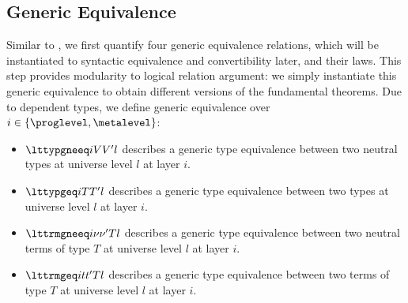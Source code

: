 \subsection{Generic Equivalence}

Similar to , we first quantify four generic equivalence relations,
which will be instantiated to syntactic equivalence and convertibility later, and
their laws. %
This step provides modularity to logical relation argument: we simply instantiate this
generic equivalence to obtain different versions of the fundamental theorems. %
Due to dependent types, we define generic equivalence over $i \in \{\proglevel, \metalevel\}$:
\begin{itemize}
\item $\lttypgneeq i V{V'} l$ describes a generic type equivalence between two neutral
  types at universe level $l$ at layer $i$.
\item $\lttypgeq i {T}{T'} l$ describes a generic type equivalence between two types at
  universe level $l$ at layer $i$.
\item $\lttrmgneeq i \nu{\nu'} T l$ describes a generic type equivalence between two neutral
  terms of type $T$ at universe level $l$ at layer $i$. 
\item $\lttrmgeq i t{t'} T l$ describes a generic type equivalence between two
  terms of type $T$ at universe level $l$ at layer $i$. 
\end{itemize}


